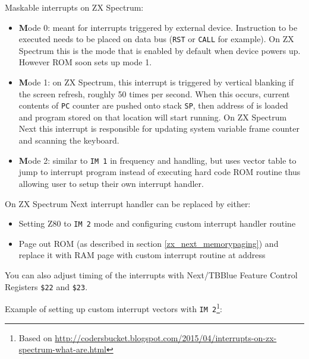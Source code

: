 \documentclass[12pt,twoside,openright,a4paper]{book}
\begin{document}
Maskable interrupts on ZX Spectrum:

\begin{itemize}
	\item {\textbf Mode 0}: meant for interrupts triggered by external device. Instruction to be executed needs to be placed on data bus ({\tt RST} or {\tt CALL} for example). On ZX Spectrum this is the mode that is enabled by default when device powers up. However ROM soon sets up mode 1.
	
	\item {\textbf Mode 1}: on ZX Spectrum, this interrupt is triggered by vertical blanking if the screen refresh, roughly 50 times per second. When this occurs, current contents of {\tt PC} counter are pushed onto stack {\tt SP}, then address of  is loaded and program stored on that location will start running. On ZX Spectrum Next this interrupt is responsible for updating system variable frame counter and scanning the keyboard.
	
	\item {\textbf Mode 2}: similar to {\tt IM 1} in frequency and handling, but uses vector table to jump to interrupt program instead of executing hard code ROM routine thus allowing user to setup their own interrupt handler.
\end{itemize}

On ZX Spectrum Next interrupt handler can be replaced by either:

\begin{itemize}
	\item Setting Z80 to {\tt IM 2} mode and configuring custom interrupt handler routine
	
	\item Page out ROM (as described in section \ref{zx_next_memorypaging}) and replace it with RAM page with custom interrupt routine at address 
\end{itemize}

You can also adjust timing of the interrupts with Next/TBBlue Feature Control Registers {\tt \$22} and {\tt \$23}.

\pagebreak
Example of setting up custom interrupt vectors with {\tt IM 2}\footnote{Based on \url{http://codersbucket.blogspot.com/2015/04/interrupts-on-zx-spectrum-what-are.html}}:
\end{document}
